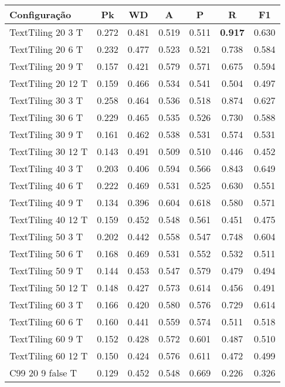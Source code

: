 \documentclass{article}
\begin{document}
 
\begin{tabular}{|l|c|c|c|c|c|c|} 
\hline 
Configuração & \textbf{Pk} & \textbf{WD} & \textbf{A } & \textbf{P } & \textbf{R } & \textbf{F1}\\ \hline
TextTiling 20  3 T & 0.272 & 0.481 & 0.519 & 0.511 & \textbf{0.917} & 0.630\\ \hline
TextTiling 20  6 T & 0.232 & 0.477 & 0.523 & 0.521 & 0.738 & 0.584\\ \hline
TextTiling 20  9 T & 0.157 & 0.421 & 0.579 & 0.571 & 0.675 & 0.594\\ \hline
TextTiling 20 12 T & 0.159 & 0.466 & 0.534 & 0.541 & 0.504 & 0.497\\ \hline
TextTiling 30  3 T & 0.258 & 0.464 & 0.536 & 0.518 & 0.874 & 0.627\\ \hline
TextTiling 30  6 T & 0.229 & 0.465 & 0.535 & 0.526 & 0.730 & 0.588\\ \hline
TextTiling 30  9 T & 0.161 & 0.462 & 0.538 & 0.531 & 0.574 & 0.531\\ \hline
TextTiling 30 12 T & 0.143 & 0.491 & 0.509 & 0.510 & 0.446 & 0.452\\ \hline
TextTiling 40  3 T & 0.203 & 0.406 & 0.594 & 0.566 & 0.843 & 0.649\\ \hline
TextTiling 40  6 T & 0.222 & 0.469 & 0.531 & 0.525 & 0.630 & 0.551\\ \hline
TextTiling 40  9 T & 0.134 & 0.396 & 0.604 & 0.618 & 0.580 & 0.571\\ \hline
TextTiling 40 12 T & 0.159 & 0.452 & 0.548 & 0.561 & 0.451 & 0.475\\ \hline
TextTiling 50  3 T & 0.202 & 0.442 & 0.558 & 0.547 & 0.748 & 0.604\\ \hline
TextTiling 50  6 T & 0.168 & 0.469 & 0.531 & 0.552 & 0.532 & 0.511\\ \hline
TextTiling 50  9 T & 0.144 & 0.453 & 0.547 & 0.579 & 0.479 & 0.494\\ \hline
TextTiling 50 12 T & 0.148 & 0.427 & 0.573 & 0.614 & 0.456 & 0.491\\ \hline
TextTiling 60  3 T & 0.166 & 0.420 & 0.580 & 0.576 & 0.729 & 0.614\\ \hline
TextTiling 60  6 T & 0.160 & 0.441 & 0.559 & 0.574 & 0.511 & 0.518\\ \hline
TextTiling 60  9 T & 0.152 & 0.428 & 0.572 & 0.601 & 0.487 & 0.510\\ \hline
TextTiling 60 12 T & 0.150 & 0.424 & 0.576 & 0.611 & 0.472 & 0.499\\ \hline
C99 20  9 false T & 0.129 & 0.452 & 0.548 & 0.669 & 0.226 & 0.326\\ \hline

\end{tabular}
\end{document}
